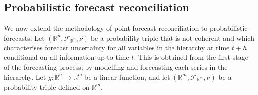 \documentclass[12pt]{article}
\newtheorem{theo}{Theorem}[section]
\theoremstyle{definition}
\begin{document}
%

\subsection{Probabilistic forecast reconciliation} \label{subsec:ProbForecastRecon}

We now extend the methodology of point forecast reconciliation to probabilistic forecasts.
Let $(\mathbb{R}^n, \mathscr{F}_{\mathbb{R}^n}, \hat{\nu})$ be a probability triple that is not coherent and which characterises forecast uncertainty for all variables in the hierarchy at time $t+h$ conditional on all information up to time $t$. This is obtained from the first stage of the forecasting process; by modelling and forecasting each series in the hierarchy. Let $g:\mathbb{R}^n \rightarrow \mathbb{R}^m $ be a linear function, and let $(\mathbb{R}^m, \mathscr{F}_{\mathbb{R}^m}, \nu)$ be a probability triple defined on $\mathbb{R}^m$.
\end{document}
